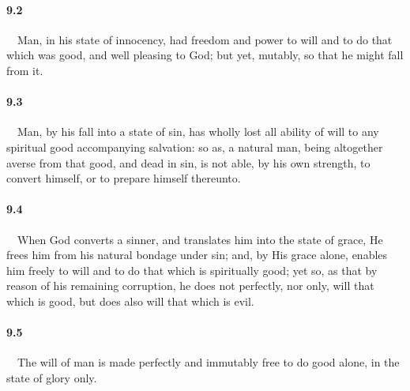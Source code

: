 \paragraph{9.2}\ \ Man, in his state of innocency, had freedom and power to will and to do that which was good, and well pleasing to God; but yet, mutably, so that he might fall from it.   
\bigskip
\paragraph{9.3}\ \ Man, by his fall into a state of sin, has wholly lost all ability of will to any spiritual good accompanying salvation: so as, a natural man, being altogether averse from that good, and dead in sin, is not able, by his own strength, to convert himself, or to prepare himself thereunto.    
\bigskip
\paragraph{9.4}\ \ When God converts a sinner, and translates him into the state of grace, He frees him from his natural bondage under sin; and, by His grace alone, enables him freely to will and to do that which is spiritually good; yet so, as that by reason of his remaining corruption, he does not perfectly, nor only, will that which is good, but does also will that which is evil.    
\bigskip
\paragraph{9.5}\ \ The will of man is made perfectly and immutably free to do good alone, in the state of glory only.  

